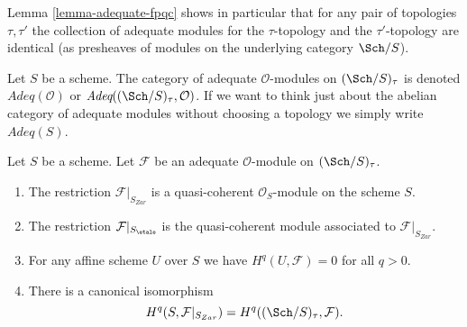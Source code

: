 \noindent
Lemma \ref{lemma-adequate-fpqc} shows in particular that
for any pair of topologies $\tau, \tau'$ the collection
of adequate modules for the $\tau$-topology and the $\tau'$-topology
are identical (as presheaves of modules on the underlying category $\Sch/S$).

\begin{definition}
\label{definition-category-adequate-modules}
Let $S$ be a scheme. The category of adequate $\mathcal{O}$-modules on
$(\Sch/S)_\tau$ is denoted {\it $\textit{Adeq}(\mathcal{O})$} or
{\it $\textit{Adeq}((\Sch/S)_\tau, \mathcal{O})$}. If we want to think just
about the abelian category of adequate modules without choosing a
topology we simply write {\it $\textit{Adeq}(S)$}.
\end{definition}

\begin{lemma}
\label{lemma-same-cohomology-adequate}
Let $S$ be a scheme. Let $\mathcal{F}$ be an adequate
$\mathcal{O}$-module on $(\Sch/S)_\tau$.
\begin{enumerate}
\item The restriction $\mathcal{F}|_{S_{Zar}}$ is a quasi-coherent
$\mathcal{O}_S$-module on the scheme $S$.
\item The restriction $\mathcal{F}|_{S_\etale}$ is the
quasi-coherent module associated to $\mathcal{F}|_{S_{Zar}}$.
\item For any affine scheme $U$ over $S$ we have $H^q(U, \mathcal{F}) = 0$
for all $q > 0$.
\item There is a canonical isomorphism
$$
H^q(S, \mathcal{F}|_{S_{Zar}}) =
H^q((\Sch/S)_\tau, \mathcal{F}).
$$
\end{enumerate}
\end{lemma}

